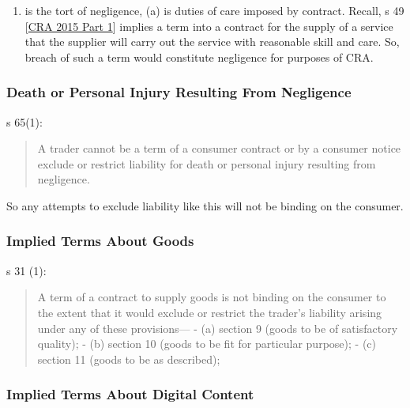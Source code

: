 \documentclass[
]{article}
\providecommand{\tightlist}{%
  \setlength{\itemsep}{0pt}\setlength{\parskip}{0pt}}
\begin{document}
\begin{enumerate}
\def\labelenumi{(\alph{enumi})}
\setcounter{enumi}{1}
\tightlist
\item
  is the tort of negligence, (a) is duties of care imposed by contract.
  Recall, s 49 {[}\protect\hyperlink{cra-2015-part-1}{CRA 2015 Part
  1}{]} implies a term into a contract for the supply of a service that
  the supplier will carry out the service with reasonable skill and
  care. So, breach of such a term would constitute negligence for
  purposes of CRA.
\end{enumerate}

\hypertarget{death-or-personal-injury-resulting-from-negligence}{%
\subsubsection{Death or Personal Injury Resulting From
Negligence}\label{death-or-personal-injury-resulting-from-negligence}}

s 65(1):

\begin{quote}
A trader cannot be a term of a consumer contract or by a consumer notice
exclude or restrict liability for death or personal injury resulting
from negligence.
\end{quote}

So any attempts to exclude liability like this will not be binding on
the consumer.

\hypertarget{implied-terms-about-goods}{%
\subsubsection{Implied Terms About
Goods}\label{implied-terms-about-goods}}

s 31 (1):

\begin{quote}
A term of a contract to supply goods is not binding on the consumer to
the extent that it would exclude or restrict the trader's liability
arising under any of these provisions--- - (a) section 9 (goods to be of
satisfactory quality); - (b) section 10 (goods to be fit for particular
purpose); - (c) section 11 (goods to be as described);
\end{quote}

\hypertarget{implied-terms-about-digital-content}{%
\subsubsection{Implied Terms About Digital
Content}\label{implied-terms-about-digital-content}}
\end{document}
